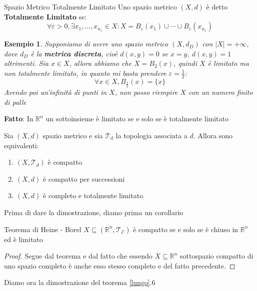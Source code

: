 \documentclass[11pt,a4paper,twoside]{article}
\newcommand{\vareps}{\varepsilon}
\newtheorem{es}{Esempio}
\theoremstyle{definition}
\begin{document}
\begin{defn}{Spazio Metrico Totalmente Limitato}{}
	Uno spazio metrico $(X,d)$ è detto \textbf{Totalmente Limitato} se:
	\[ \forall \vareps>0, \exists x_1,...,x_{n_\vareps}  \in X: X = B_\vareps (x_1)\cup \cdots \cup B_\vareps (x_{n_\vareps})\]
\end{defn}

\begin{es}
	Supponiamo di avere uno spazio metrico $(X,d_D)$ con $|X| = +\infty$, dove $d_D$ è la \textbf{metrica discreta}, cioè $d(x,y) = 0$ se $x = y$, $d(x,y)=1$  altrimenti. Sia $x \in X$, allora abbiamo che $X = B_2(x)$, quindi $X$ è limitato ma non totalmente limitato, in quanto mi basta prendere $\vareps = \frac 12$:
	\[ \forall x \in X, B_{\frac 12}(x) = \{x\} \]
	Avendo poi un'infinità di punti in $X$, non posso riempire $X$ con un numero finito di palle
\end{es}

\textbf{Fatto}: In $\mathbb R^n$ un sottoinsieme è limitato se e solo se è totalmente limitato

\begin{thm}{}{}\label{lungo}
	Sia $(X,d)$ spazio metrico e sia $\mathcal T_d$ la topologia associata a $d$. Allora sono equivalenti:
	\begin{enumerate}
		\item $(X, \mathcal T_d)$ è compatto
		\item $(X, d)$ è compatto per successioni
		\item $(X, d)$ è completo e totalmente limitato
	\end{enumerate}
\end{thm}

Prima di dare la dimostrazione, diamo prima un corollario

\begin{cor}{Teorema di Heine - Borel}{}
	$X \subseteq (\mathbb R^n, \mathcal T_\mathcal E)$ è compatto se e solo se è chiuso in $\mathbb R^n$ ed è limitato
\end{cor}

\begin{proof}
	Segue dal teorema e dal fatto che essendo $X\subseteq \mathbb R^n$ sottospazio compatto di uno spazio completo è anche esso stesso completo e del fatto precedente.
\end{proof}

Diamo ora la dimostrazione del teorema \ref{lungo}.6
\end{document}
